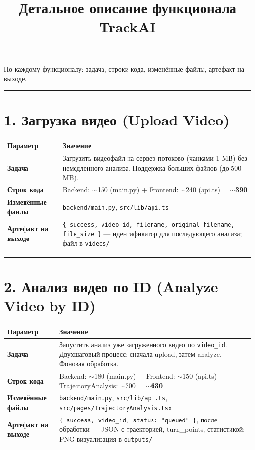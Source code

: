 \documentclass[12pt,a4paper]{article}
\title{Детальное описание функционала TrackAI}
\author{}
\date{}
\begin{document}
\maketitle

По каждому функционалу: задача, строки кода, изменённые файлы, артефакт на выходе.

\vspace{1em}
\hrule
\vspace{1em}

\section{1. Загрузка видео (Upload Video)}

\begin{tabular}{>{\bfseries}l p{10cm}}
\toprule
Параметр & Значение \\
\midrule
Задача & Загрузить видеофайл на сервер потоково (чанками 1 MB) без немедленного анализа. Поддержка больших файлов (до 500 MB). \\
Строк кода & Backend: $\sim$150 (main.py) + Frontend: $\sim$240 (api.ts) = \textbf{$\sim$390} \\
Изменённые файлы & \texttt{backend/main.py}, \texttt{src/lib/api.ts} \\
Артефакт на выходе & \texttt{\{ success, video\_id, filename, original\_filename, file\_size \}} — идентификатор для последующего анализа; файл в \texttt{videos/} \\
\bottomrule
\end{tabular}

\vspace{1em}
\hrule
\vspace{1em}

\section{2. Анализ видео по ID (Analyze Video by ID)}

\begin{tabular}{>{\bfseries}l p{10cm}}
\toprule
Параметр & Значение \\
\midrule
Задача & Запустить анализ уже загруженного видео по \texttt{video\_id}. Двухшаговый процесс: сначала upload, затем analyze. Фоновая обработка. \\
Строк кода & Backend: $\sim$180 (main.py) + Frontend: $\sim$150 (api.ts) + TrajectoryAnalysis: $\sim$300 = \textbf{$\sim$630} \\
Изменённые файлы & \texttt{backend/main.py}, \texttt{src/lib/api.ts}, \texttt{src/pages/TrajectoryAnalysis.tsx} \\
Артефакт на выходе & \texttt{\{ success, video\_id, status: "queued" \}}; после обработки — JSON с траекторией, turn\_points, статистикой; PNG-визуализация в \texttt{outputs/} \\
\bottomrule
\end{tabular}
\end{document}
